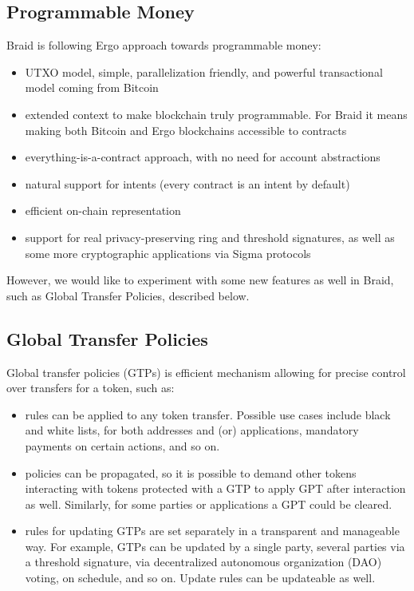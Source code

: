 \documentclass{llncs}   %
\newcommand{\bc}{Braid}
\begin{document}
\subsection{Programmable Money}

\bc{} is following Ergo approach towards programmable money:
\begin{itemize}
  \item UTXO model, simple, parallelization friendly, and powerful transactional model coming from Bitcoin
  \item extended context to make blockchain truly programmable. For \bc{} it means making both Bitcoin and Ergo
  blockchains accessible to contracts
  \item everything-is-a-contract approach, with no need for account abstractions
  \item natural support for intents (every contract is an intent by default)
  \item efficient on-chain representation
  \item support for real privacy-preserving ring and threshold signatures, as well as some more cryptographic
  applications via Sigma protocols
\end{itemize}

However, we would like to experiment with some new features as well in \bc{}, such as Global Transfer Policies,
described below.

\subsection{Global Transfer Policies}

Global transfer policies (GTPs) is efficient mechanism allowing for precise control over transfers for a token, such as:
\begin{itemize}
  \item rules can be applied to any token transfer. Possible use cases include black and white lists, for both addresses
  and (or) applications, mandatory payments on certain actions, and so on.
  \item policies can be propagated, so it is possible to demand other tokens interacting with tokens protected with a GTP to
  apply GPT after interaction as well. Similarly, for some parties or applications a GPT could be cleared.
  \item rules for updating GTPs are set separately in a transparent and manageable way. For example, GTPs can be updated
  by a single party, several parties via a threshold signature, via decentralized autonomous organization (DAO) voting,
  on schedule, and so on. Update rules can be updateable as well.
\end{itemize}
\end{document}

